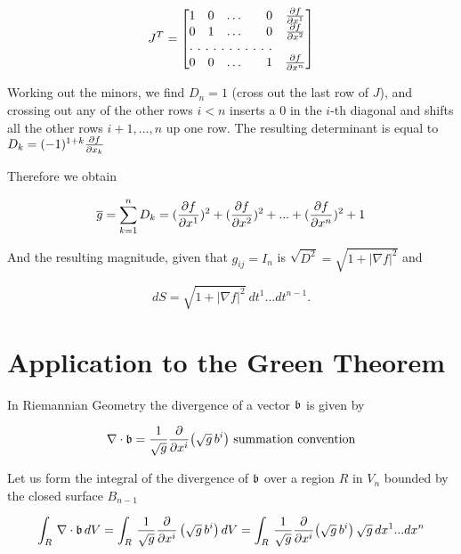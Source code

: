 \begin{equation}
J^T  =
\begin{bmatrix}
1 & 0 & \hdots  & & 0 & {\partial f\over \partial x^1}  \\
0 & 1  & \hdots & & 0 &{\partial f\over \partial x^2}  \\
\hdotsfor[2]{5}\\
0 & 0  & \hdots & & 1 &{\partial f\over \partial x^n} \\
\end{bmatrix}
\end{equation}

Working out the minors, we find 
$D_n = 1$ (cross out the last row of $J$), and crossing out any of the other rows $i<n$ inserts a $0$ in the $i$-th diagonal and shifts all the other rows $i+1, ..., n$ up one row. The resulting determinant is equal to  
$D_k = (-1)^{1+k}{\partial f\over \partial x_k}$
 
Therefore we obtain 

\begin{equation}
\overline{g} = \sum_{k=1}^n D_k = ({\partial f\over \partial x^1})^2 + ({\partial f\over \partial x^2})^2 + ... +  ({\partial f\over \partial x^n})^2 + 1  
\end{equation} 
 
And the resulting magnitude, given that $g_{ij} = I_n$ is 
$\sqrt{D^2} = \sqrt{1 + |\nabla f|^2}$ and

\begin{equation}
dS = \sqrt{1 + | \nabla f |^2} ~dt^1...dt^{n-1}.\label{Stephen}
\end{equation}

\section{Application to the Green Theorem}

In Riemannian Geometry the divergence of a vector $\mathfrak{b}$ is given by 

$$ \nabla \cdot \mathfrak{b} = {1\over \sqrt{g} }  {\partial\over \partial x^i} \big(\sqrt{g}\, b^i\big) \hbox{~summation convention}$$

Let us form the integral of the divergence of $\mathfrak{b}$ over a region $R$ in $V_n$ bounded by the closed surface $B_{n-1}$

\begin{equation}
\int_{R} \, \nabla \cdot \mathfrak{b}\, dV = \int_R \, {1\over \sqrt{g} }  {\partial\over \partial x^i} \,\big(\sqrt{g}\, b^i\big)\,  dV =\int_R\, {1\over \sqrt{g} }  {\partial\over \partial x^i} \big(\sqrt{g}\, b^i\big)\,\sqrt{g}\, dx^1...dx^n 
\end{equation}

